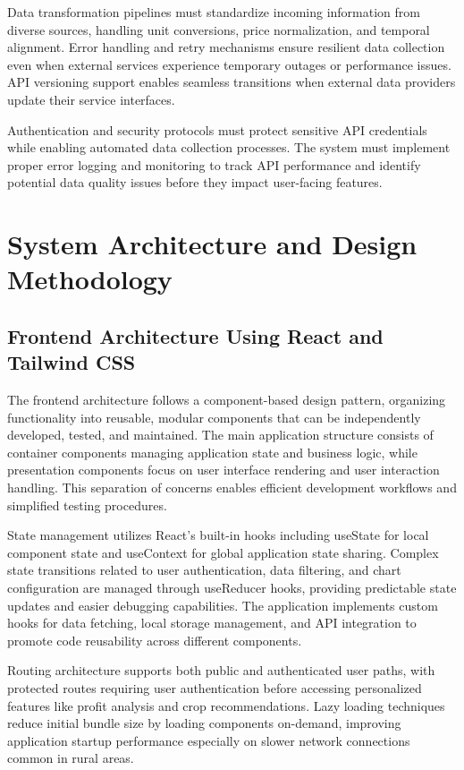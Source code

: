 Data transformation pipelines must standardize incoming information from diverse sources, handling unit conversions, price normalization, and temporal alignment. Error handling and retry mechanisms ensure resilient data collection even when external services experience temporary outages or performance issues. API versioning support enables seamless transitions when external data providers update their service interfaces.

Authentication and security protocols must protect sensitive API credentials while enabling automated data collection processes. The system must implement proper error logging and monitoring to track API performance and identify potential data quality issues before they impact user-facing features.

\section{System Architecture and Design Methodology}

\subsection{Frontend Architecture Using React and Tailwind CSS}

The frontend architecture follows a component-based design pattern, organizing functionality into reusable, modular components that can be independently developed, tested, and maintained. The main application structure consists of container components managing application state and business logic, while presentation components focus on user interface rendering and user interaction handling. This separation of concerns enables efficient development workflows and simplified testing procedures.

State management utilizes React's built-in hooks including useState for local component state and useContext for global application state sharing. Complex state transitions related to user authentication, data filtering, and chart configuration are managed through useReducer hooks, providing predictable state updates and easier debugging capabilities. The application implements custom hooks for data fetching, local storage management, and API integration to promote code reusability across different components.

Routing architecture supports both public and authenticated user paths, with protected routes requiring user authentication before accessing personalized features like profit analysis and crop recommendations. Lazy loading techniques reduce initial bundle size by loading components on-demand, improving application startup performance especially on slower network connections common in rural areas.

